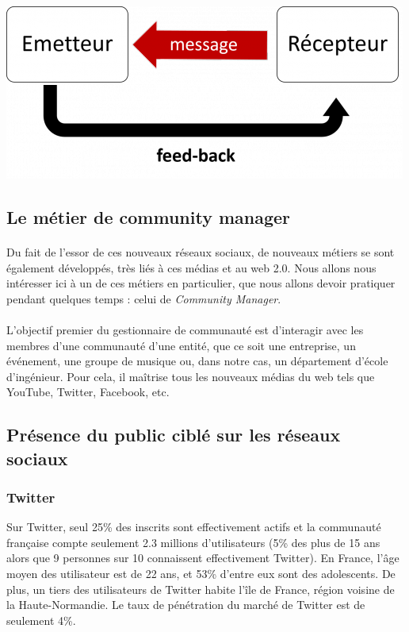 \begin{center}
\includegraphics[scale=0.5]{./image/communication_digitale.png}
\end{center}

\subsection{Le métier de community manager}

\paragraph{}
Du fait de l'essor de ces nouveaux réseaux sociaux, de nouveaux métiers se sont également développés, 
très liés à ces médias et au web 2.0. Nous allons nous intéresser ici à un de ces métiers en particulier, 
que nous allons devoir pratiquer pendant quelques temps : celui de \emph{Community Manager}.

\paragraph{}
L'objectif premier du gestionnaire de communauté est d'interagir avec les membres d'une communauté d'une 
entité, que ce soit une entreprise, un événement, une groupe de musique ou, dans notre cas, un département 
d'école d'ingénieur. Pour cela, il maîtrise tous les nouveaux médias du web tels que YouTube, Twitter, 
Facebook, etc. 

\subsection{Présence du public ciblé sur les réseaux sociaux}
\subsubsection{Twitter}
Sur Twitter, seul 25\% des inscrits sont effectivement actifs et la communauté française compte seulement 2.3 millions d'utilisateurs (5\% des plus de 15 ans alors que 9 personnes sur 10 connaissent effectivement Twitter).
En France, l'âge moyen des utilisateur est de 22 ans, et 53\% d'entre eux sont des adolescents. De plus, un tiers des utilisateurs de Twitter habite l'île de France, région voisine de la Haute-Normandie. Le taux de pénétration du marché de Twitter est de seulement 4\%.

